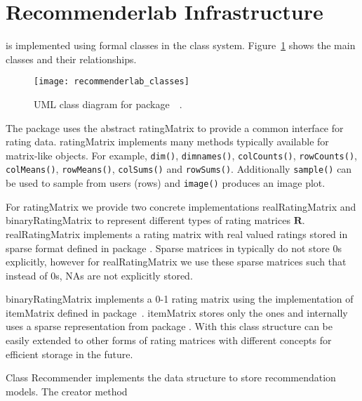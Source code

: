 \documentclass[nojss]{jss}
\newcommand{\class}[1]{\mbox{\textsf{#1}}}
\newcommand{\func}[1]{\mbox{\texttt{#1()}}}
\newcommand{\mat}[1]{{\mathbf{#1}}}
\begin{document}
\section{Recommenderlab Infrastructure}
\label{sec:infrastructure}
 is implemented using formal classes in
the  class system.
Figure~\ref{fig:class_diagram} shows the main classes and their relationships.

\begin{figure}
\centerline{\texttt{[image: recommenderlab\_classes]}}
\caption{UML class diagram for
package~~\citep{misc:Fowler:2004}.}
\label{fig:class_diagram}
\end{figure}

The package uses the abstract \class{ratingMatrix}
to provide a common interface for rating data. \class{ratingMatrix}
implements many methods typically available for matrix-like
objects. For example, \func{dim}, \func{dimnames},
\func{colCounts}, \func{rowCounts},
\func{colMeans}, \func{rowMeans},
\func{colSums} and \func{rowSums}.
Additionally \func{sample} can be used to sample from users (rows) and
\func{image} produces an image plot.

For \class{ratingMatrix} we provide two concrete
implementations \class{realRatingMatrix} and
\class{binaryRatingMatrix} to represent different types of rating
matrices $\mat{R}$.
\class{realRatingMatrix} implements a rating matrix with real valued
ratings stored in sparse format defined in package .
Sparse matrices in  typically do not store 0s explicitly,
however for \class{realRatingMatrix} we use these sparse matrices
such that instead of 0s, NAs are not explicitly stored.

\class{binaryRatingMatrix} implements a 0-1 rating matrix using the
implementation of \class{itemMatrix} defined in package~.
\class{itemMatrix} stores only the ones and internally uses a sparse
representation from package .  With this class structure
 can be easily extended to other forms of rating matrices
with different concepts for efficient storage in the future.

Class \class{Recommender} implements the data structure to store recommendation
models. The creator method

\begin{center}
\end{center}
\end{document}
